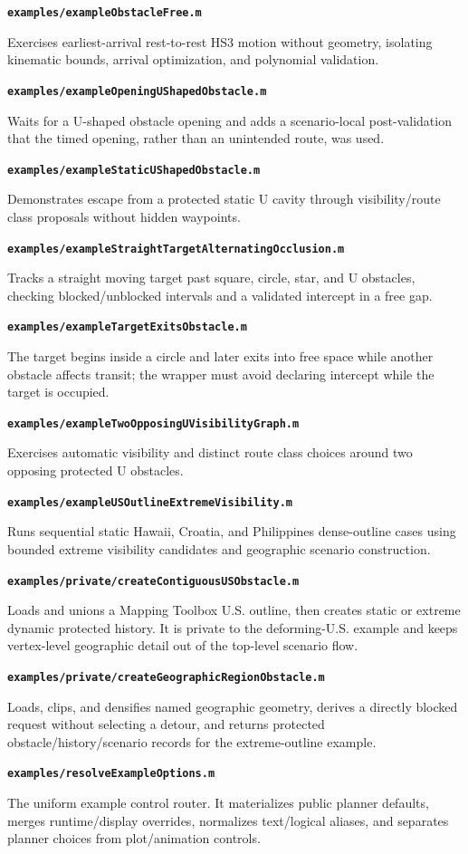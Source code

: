 \documentclass[10pt,letterpaper]{article}
\newcommand{\file}[1]{\nolinkurl{#1}}
\newcommand{\scriptentry}[2]{%
  \par\medskip\noindent\textbf{\file{#1}}\par
  \begingroup\raggedright #2\par\endgroup
}
\begin{document}
\scriptentry{examples/exampleObstacleFree.m}{Exercises earliest-arrival
rest-to-rest HS3 motion without geometry, isolating kinematic bounds, arrival
optimization, and polynomial validation.}

\scriptentry{examples/exampleOpeningUShapedObstacle.m}{Waits for a U-shaped
obstacle opening and adds a scenario-local post-validation that the timed
opening, rather than an unintended route, was used.}

\scriptentry{examples/exampleStaticUShapedObstacle.m}{Demonstrates escape from
a protected static U cavity through visibility/route class proposals without
hidden waypoints.}

\scriptentry{examples/exampleStraightTargetAlternatingOcclusion.m}{Tracks a
straight moving target past square, circle, star, and U obstacles, checking
blocked/unblocked intervals and a validated intercept in a free gap.}

\scriptentry{examples/exampleTargetExitsObstacle.m}{The target begins inside a
circle and later exits into free space while another obstacle affects transit;
the wrapper must avoid declaring intercept while the target is occupied.}

\scriptentry{examples/exampleTwoOpposingUVisibilityGraph.m}{Exercises automatic
visibility and distinct route class choices around two opposing protected U
obstacles.}

\scriptentry{examples/exampleUSOutlineExtremeVisibility.m}{Runs sequential
static Hawaii, Croatia, and Philippines dense-outline cases using bounded
extreme visibility candidates and geographic scenario construction.}

\scriptentry{examples/private/createContiguousUSObstacle.m}{Loads and unions a
Mapping Toolbox U.S. outline, then creates static or extreme dynamic protected
history. It is private to the deforming-U.S. example and keeps vertex-level
geographic detail out of the top-level scenario flow.}

\scriptentry{examples/private/createGeographicRegionObstacle.m}{Loads, clips,
and densifies named geographic geometry, derives a directly blocked request
without selecting a detour, and returns protected obstacle/history/scenario
records for the extreme-outline example.}

\scriptentry{examples/resolveExampleOptions.m}{The uniform example control
router. It materializes public planner defaults, merges runtime/display
overrides, normalizes text/logical aliases, and separates planner choices from
plot/animation controls.}
\end{document}
